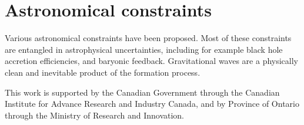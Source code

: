 \documentclass{nature}
\begin{document}
\section{Astronomical constraints}

Various astronomical constraints have been
proposed\cite{2016arXiv160706077C}. Most of these constraints are
entangled in astrophysical uncertainties, including for example black
hole accretion efficiencies, and baryonic feedback.  Gravitational
waves are a physically clean and inevitable product of the formation
process.



\begin{addendum}
\item 
This work is supported by the Canadian Government through the Canadian
Institute for Advance Research and Industry Canada, and by Province of
Ontario through the Ministry of Research and Innovation.
\end{addendum}

\appendix

%


\end{document}
